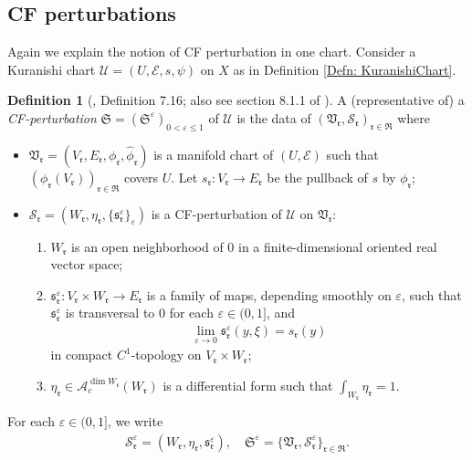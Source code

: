 \documentclass[10pt]{amsart}
\numberwithin{equation}{section}
\theoremstyle{plain}
\theoremstyle{definition}
\newtheorem{definition}[theorem]{Definition}
\theoremstyle{remark}
\numberwithin{equation}{section}
\newcommand{\wh}[1]{\widehat{#1}}
\newcommand{\mf}[1]{\mathfrak{#1}}
\newcommand{\ms}[1]{\mathscr{#1}}
\begin{document}
{\subsection{CF perturbations}
Again we explain the notion of CF perturbation in one chart.
Consider a Kuranishi chart $\mathscr{U} = (U,\mathscr{E},s,\psi)$ on $X$ as in Definition \ref{Defn: KuranishiChart}. 

\begin{definition}[\cite{FOOO20book}, Definition 7.16; also see section 8.1.1 of \cite{Irie2}]\label{Defn: CF-perturb} 
	A (representative of) a \emph{CF-perturbation} $\mf{S}=(\mf{S}^\varepsilon)_{0<\varepsilon\leq 1}$ of $\ms{U}$ is the data of $(\mf{V}_\mf{r}, \ms{S}_\mf{r})_{\mf{r}\in\mf{R}}$ where 
	\begin{itemize}
		\item $\mf{V}_\mf{r}=(V_\mf{r}, E_\mf{r}, \phi_\mf{r}, \wh{\phi}_\mf{r})$ is a manifold chart of $(U,\ms{E})$ such that $(\phi_\mf{r}(V_\mf{r}))_{\mf{r}\in\mf{R}}$ covers $U$. Let $s_\mf{r}\colon V_\mf{r}\to E_\mf{r}$ be the pullback of $s$ by $\phi_\mf{r}$;
		\item $\ms{S}_\mf{r}=(W_\mf{r}, \eta_\mf{r}, \{\mf{s}_\mf{r}^\varepsilon\}_\varepsilon)$ is a CF-perturbation of $\ms{U}$ on $\mf{V}_\mf{r}$:
		\begin{enumerate}
			\item $W_\mf{r}$ is an open neighborhood of 0 in a finite-dimensional oriented real vector space;
			\item $\mf{s}_\mf{r}^\varepsilon\colon V_\mf{r}\times W_\mf{r}\to E_\mf{r}$   is a family of maps,  depending smoothly on $\varepsilon$, such that $\mf{s}^\varepsilon_\mf{r}$ is transversal to $0$ for each $\varepsilon\in (0,1]$, and \begin{align*}
				\lim_{\varepsilon\to 0} \mf{s}^\varepsilon_\mf{r}(y,\xi) = s_\mf{r}(y)
			\end{align*} 
			in compact $C^1$-topology on $V_\mf{r}\times W_\mf{r}$;
			\item $\eta_\mf{r}\in \ms{A}_c^{\dim W_\mf{r}}(W_\mf{r})$ is a differential form such that $\int_{W_\mf{r}} \eta_\mf{r} = 1$.
		\end{enumerate}
	\end{itemize}
\end{definition}

For each $\varepsilon\in (0,1]$, we write
\begin{align*}
	\ms{S}_\mf{r}^\varepsilon = (W_\mf{r}, \eta_\mf{r}, \mf{s}_\mf{r}^\varepsilon),\quad 
	\mf{S}^\varepsilon=\{\mf{V}_\mf{r}, \ms{S}^\varepsilon_\mf{r}\}_{\mf{r}\in\mf{R}}.
\end{align*}

}
\end{document}
